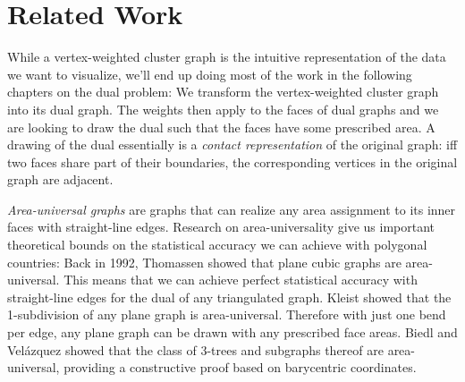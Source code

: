 \section{Related Work}
\label{sect:related-work}



While a vertex-weighted cluster graph is the intuitive representation of the data we want to visualize, we'll end up doing most of the work in the following chapters on the dual problem: We transform the vertex-weighted cluster graph into its dual graph. The weights then apply to the faces of dual graphs and we are looking to draw the dual such that the faces have some prescribed area. A drawing of the dual essentially is a \emph{contact representation} of the original graph: iff two faces share part of their boundaries, the corresponding vertices in the original graph are adjacent.

\emph{Area-universal graphs} are graphs that can realize any area assignment to its inner faces with straight-line edges. Research on area-universality give us important theoretical bounds on the statistical accuracy we can achieve with polygonal countries: Back in 1992, Thomassen \cite{thomassen} showed that plane cubic graphs are area-universal. This means that we can achieve perfect statistical accuracy with straight-line edges for the dual of any triangulated graph. Kleist \cite{kleistplanar} \cite{areauniversality} showed that the 1-subdivision of any plane graph is area-universal. Therefore with just one bend per edge, any plane graph can be drawn with any prescribed face areas. Biedl and Velázquez \cite{biedltrees} showed that the class of 3-trees and subgraphs thereof are area-universal, providing a constructive proof based on barycentric coordinates.

